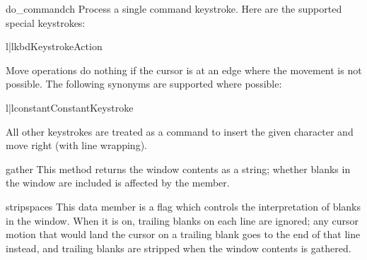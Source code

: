 \begin{methoddesc}{do_command}{ch}
Process a single command keystroke.  Here are the supported special
keystrokes: 

\begin{tableii}{l|l}{kbd}{Keystroke}{Action}
\end{tableii}

Move operations do nothing if the cursor is at an edge where the
movement is not possible.  The following synonyms are supported where
possible:

\begin{tableii}{l|l}{constant}{Constant}{Keystroke}
\end{tableii}

All other keystrokes are treated as a command to insert the given
character and move right (with line wrapping).
\end{methoddesc}

\begin{methoddesc}{gather}{}
This method returns the window contents as a string; whether blanks in
the window are included is affected by the 
member.
\end{methoddesc}

\begin{memberdesc}{stripspaces}
This data member is a flag which controls the interpretation of blanks in
the window.  When it is on, trailing blanks on each line are ignored;
any cursor motion that would land the cursor on a trailing blank goes
to the end of that line instead, and trailing blanks are stripped when
the window contents is gathered.
\end{memberdesc}


